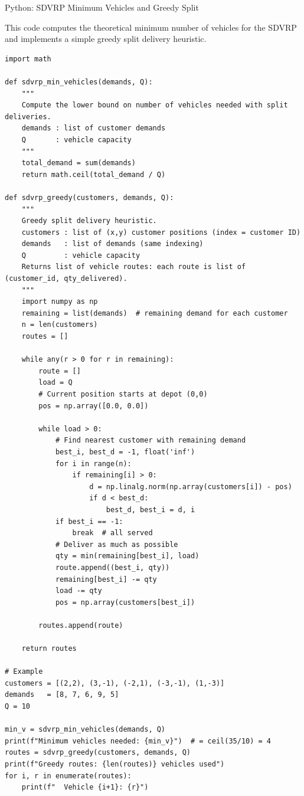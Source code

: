 \documentclass[aspectratio=169,10pt]{beamer}
\begin{document}
\begin{frame}[fragile]{Python: SDVRP Minimum Vehicles and Greedy Split}

This code computes the theoretical minimum number of vehicles for the SDVRP
and implements a simple greedy split delivery heuristic.

\begin{lstlisting}
import math

def sdvrp_min_vehicles(demands, Q):
    """
    Compute the lower bound on number of vehicles needed with split deliveries.
    demands : list of customer demands
    Q       : vehicle capacity
    """
    total_demand = sum(demands)
    return math.ceil(total_demand / Q)

def sdvrp_greedy(customers, demands, Q):
    """
    Greedy split delivery heuristic.
    customers : list of (x,y) customer positions (index = customer ID)
    demands   : list of demands (same indexing)
    Q         : vehicle capacity
    Returns list of vehicle routes: each route is list of (customer_id, qty_delivered).
    """
    import numpy as np
    remaining = list(demands)  # remaining demand for each customer
    n = len(customers)
    routes = []

    while any(r > 0 for r in remaining):
        route = []
        load = Q
        # Current position starts at depot (0,0)
        pos = np.array([0.0, 0.0])

        while load > 0:
            # Find nearest customer with remaining demand
            best_i, best_d = -1, float('inf')
            for i in range(n):
                if remaining[i] > 0:
                    d = np.linalg.norm(np.array(customers[i]) - pos)
                    if d < best_d:
                        best_d, best_i = d, i
            if best_i == -1:
                break  # all served
            # Deliver as much as possible
            qty = min(remaining[best_i], load)
            route.append((best_i, qty))
            remaining[best_i] -= qty
            load -= qty
            pos = np.array(customers[best_i])

        routes.append(route)

    return routes

# Example
customers = [(2,2), (3,-1), (-2,1), (-3,-1), (1,-3)]
demands   = [8, 7, 6, 9, 5]
Q = 10

min_v = sdvrp_min_vehicles(demands, Q)
print(f"Minimum vehicles needed: {min_v}")  # = ceil(35/10) = 4
routes = sdvrp_greedy(customers, demands, Q)
print(f"Greedy routes: {len(routes)} vehicles used")
for i, r in enumerate(routes):
    print(f"  Vehicle {i+1}: {r}")
\end{lstlisting}

\end{frame}
\end{document}
